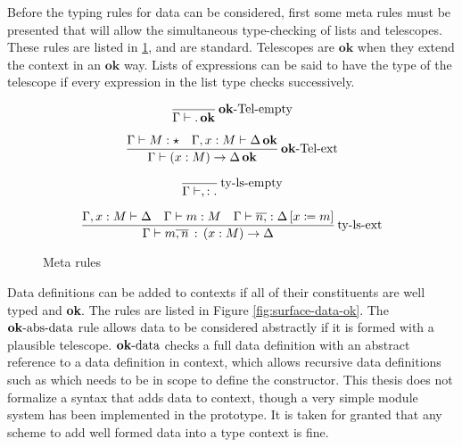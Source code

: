 Before the typing rules for data can be considered, first some meta rules must be presented that will allow the simultaneous type-checking of lists and telescopes.
These rules are listed in \ref{fig:surface-data-meta-ty}, and are standard.
Telescopes are $\mathbf{ok}$ when they extend the context in an $\mathbf{ok}$ way.
Lists of expressions can be said to have the type of the telescope if every expression in the list type checks successively.

\begin{figure}
\[
\frac{
  \,
  }{\Gamma\vdash.\,\mathbf{ok}}\operatorname{\mathbf{ok}-Tel-empty}
\]

\[
\frac{
  \Gamma\vdash M:\star\quad\Gamma,x:M\vdash\Delta\,\mathbf{ok}
  }{\Gamma\vdash\left(x:M\right)\rightarrow\Delta\,\mathbf{ok}}\operatorname{\mathbf{ok}-Tel-ext}
\]

\[
\frac{
  \,
}{\Gamma\vdash,:.}\operatorname{ty-ls-empty}
\]

\[
\frac{
  \Gamma,x:M\vdash\Delta\quad\Gamma\vdash m:M\quad\Gamma\vdash\overline{n,} %
  :\Delta\left[x\coloneqq m\right]
  }{\Gamma\vdash m\overline{,n}\,:\,\left(x:M\right)\rightarrow\Delta}\rulename{ty-ls-ext}
\]

\caption{Meta rules}
\label{fig:surface-data-meta-ty}
\end{figure}

Data definitions can be added to contexts if all of their constituents are well typed and \textbf{ok}.
The rules are listed in Figure \ref{fig:surface-data-ok}.
The $\operatorname{\mathbf{ok}-abs-data}$ rule allows data to be considered abstractly if it is formed with a plausible telescope.
$\operatorname{\mathbf{ok}-data}$ checks a full data definition with an abstract reference to a data definition in context, which allows recursive data definitions such as \Nat{} which needs \Nat{} to be in scope to define the \Suc{} constructor.
This thesis does not formalize a syntax that adds data to context, though a very simple module system has been implemented in the prototype.
It is taken for granted that any scheme to add well formed data into a type context is fine.

